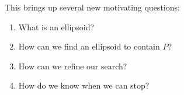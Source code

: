 This brings up several new motivating questions:
\begin{enumerate}
  \item What is an ellipsoid?
    
  \item How can we find an ellipsoid to contain \(P\)?

  \item How can we refine our search?

  \item How do we know when we can stop?
\end{enumerate}


